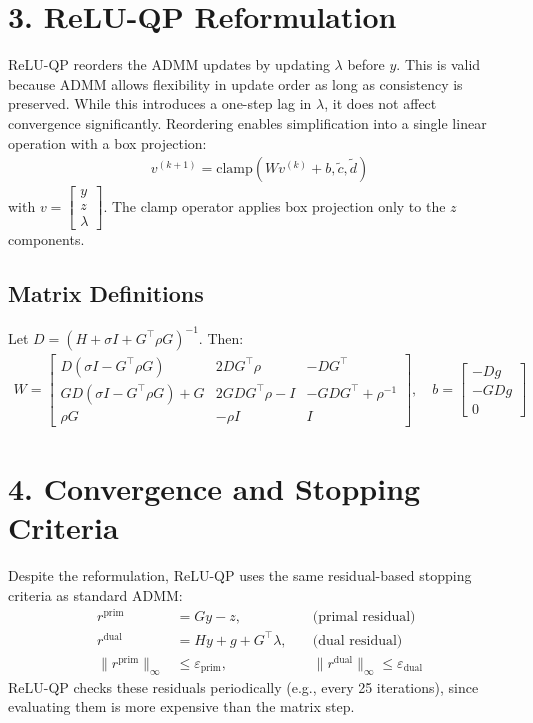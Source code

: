 \documentclass[11pt]{article}
\begin{document}
\section*{3. ReLU-QP Reformulation}
ReLU-QP reorders the ADMM updates by updating $\lambda$ before $y$. This is valid because ADMM allows flexibility in update order as long as consistency is preserved. While this introduces a one-step lag in $\lambda$, it does not affect convergence significantly. Reordering enables simplification into a single linear operation with a box projection:
\begin{align*}
    v^{(k+1)} = \text{clamp}(W v^{(k)} + b, \tilde{c}, \tilde{d})
\end{align*}
with $v = \begin{bmatrix} y \\ z \\ \lambda \end{bmatrix}$. The clamp operator applies box projection only to the $z$ components.

\subsection*{Matrix Definitions}
Let $D = (H + \sigma I + G^\top \rho G)^{-1}$. Then:
\begin{align*}
    W = \begin{bmatrix}
        D(\sigma I - G^\top \rho G) & 2 D G^\top \rho & -D G^\top \\
        G D(\sigma I - G^\top \rho G) + G & 2 G D G^\top \rho - I & -G D G^\top + \rho^{-1} \\
        \rho G & -\rho I & I
    \end{bmatrix},
    \quad
    b = \begin{bmatrix} -D g \\ -G D g \\ 0 \end{bmatrix}
\end{align*}

\section*{4. Convergence and Stopping Criteria}
Despite the reformulation, ReLU-QP uses the same residual-based stopping criteria as standard ADMM:
\begin{align*}
    r^\text{prim} &= G y - z, & \quad \text{(primal residual)} \\
    r^\text{dual} &= H y + g + G^\top \lambda, & \quad \text{(dual residual)} \\
    \|r^\text{prim}\|_\infty &\leq \varepsilon_\text{prim}, & \quad \|r^\text{dual}\|_\infty \leq \varepsilon_\text{dual}
\end{align*}
ReLU-QP checks these residuals periodically (e.g., every 25 iterations), since evaluating them is more expensive than the matrix step.
\end{document}
